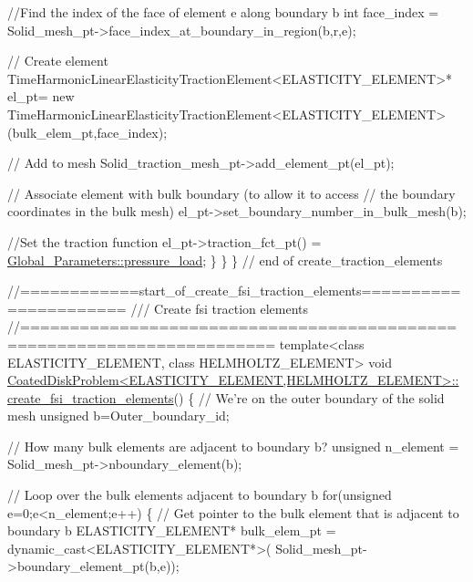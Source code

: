 \begin{DoxyCodeInclude}
{     \textcolor{comment}{//Find the index of the face of element e along boundary b}
     \textcolor{keywordtype}{int} face\_index = Solid\_mesh\_pt->face\_index\_at\_boundary\_in\_region(b,r,e);
     
     \textcolor{comment}{// Create element}
     TimeHarmonicLinearElasticityTractionElement<ELASTICITY\_ELEMENT>* el\_pt=
      \textcolor{keyword}{new} TimeHarmonicLinearElasticityTractionElement<ELASTICITY\_ELEMENT>
      (bulk\_elem\_pt,face\_index);   
     
     \textcolor{comment}{// Add to mesh}
     Solid\_traction\_mesh\_pt->add\_element\_pt(el\_pt);
     
     \textcolor{comment}{// Associate element with bulk boundary (to allow it to access}
     \textcolor{comment}{// the boundary coordinates in the bulk mesh)}
     el\_pt->set\_boundary\_number\_in\_bulk\_mesh(b); 
     
     \textcolor{comment}{//Set the traction function}
     el\_pt->traction\_fct\_pt() = \hyperlink{namespaceGlobal__Parameters_a0ddb3a77481b907fbb34f2e8d0a6eb9f}{Global\_Parameters::pressure\_load};  
    \}
  \}
\} \textcolor{comment}{// end of create\_traction\_elements}




\textcolor{comment}{//============start\_of\_create\_fsi\_traction\_elements======================}\textcolor{comment}{}
\textcolor{comment}{/// Create fsi traction elements }
\textcolor{comment}{}\textcolor{comment}{//=======================================================================}
\textcolor{keyword}{template}<\textcolor{keyword}{class} ELASTICITY\_ELEMENT, \textcolor{keyword}{class} HELMHOLTZ\_ELEMENT>
\textcolor{keywordtype}{void} \hyperlink{classCoatedDiskProblem_a143908e8db74ad6bd8b7efaaa26c78c3}{CoatedDiskProblem<ELASTICITY\_ELEMENT,HELMHOLTZ\_ELEMENT>::}
\hyperlink{classCoatedDiskProblem_a143908e8db74ad6bd8b7efaaa26c78c3}{create\_fsi\_traction\_elements}()
\{
 \textcolor{comment}{// We're on the outer boundary of the solid mesh}
 \textcolor{keywordtype}{unsigned} b=Outer\_boundary\_id;

 \textcolor{comment}{// How many bulk elements are adjacent to boundary b?}
 \textcolor{keywordtype}{unsigned} n\_element = Solid\_mesh\_pt->nboundary\_element(b);
 
 \textcolor{comment}{// Loop over the bulk elements adjacent to boundary b}
 \textcolor{keywordflow}{for}(\textcolor{keywordtype}{unsigned} e=0;e<n\_element;e++)
  \{
   \textcolor{comment}{// Get pointer to the bulk element that is adjacent to boundary b}
   ELASTICITY\_ELEMENT* bulk\_elem\_pt = \textcolor{keyword}{dynamic\_cast<}ELASTICITY\_ELEMENT*\textcolor{keyword}{>}(
    Solid\_mesh\_pt->boundary\_element\_pt(b,e));
   
}
\end{DoxyCodeInclude}
